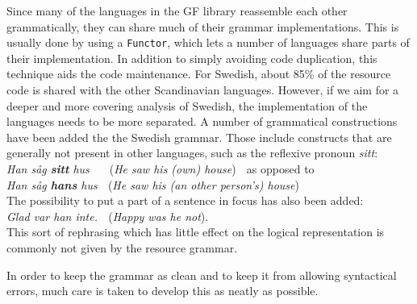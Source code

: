 \documentclass[submission]{eptcs} %
\begin{document}
Since many of the languages in the GF library reassemble each other grammatically,
they can share much of their grammar implementations. This is usually done by using a
\verb|Functor|, which lets a number of languages share parts of their implementation. 
In addition to simply avoiding code duplication, this technique aids the code maintenance.
For Swedish, about 85\% of the resource code is shared with the other Scandinavian
languages. %
However, if we aim for a deeper and more covering analysis of Swedish,
the implementation of the languages needs to be more separated. 
A number of grammatical constructions have been added the the Swedish grammar.
Those include constructs that are generally not present in other languages,
such as the reflexive pronoun \emph{sitt}: \\
\emph{Han såg \textbf{sitt} hus} $\; \; \; \;$ (\emph{He saw his (own) house}) $\;$
as opposed to \\
\emph{Han såg \textbf{hans} hus} $\;$ (\emph{He saw his (an other person's) house}) \\
The possibility to put a part of a sentence in focus has also been added:\\
\emph{Glad var han inte.} $\;$ (\emph{Happy was he not}). \\
This sort of rephrasing which has little effect on the logical representation
is commonly not given by the resource grammar.

In order to keep the grammar as clean and to keep it from allowing syntactical errors,
much care is taken to develop this as neatly as possible. 
\end{document}
